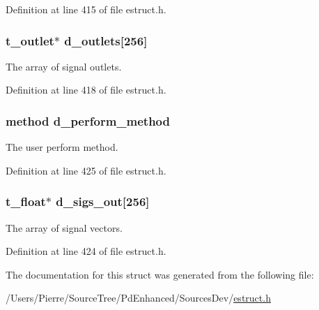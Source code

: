 Definition at line 415 of file estruct.\-h.

\hypertarget{struct__edspobj_a529a1e3597eb3ee79f6cabef51f41ef9}{
\subsubsection[{d\-\_\-outlets}]{\setlength{\rightskip}{0pt plus 5cm}t\-\_\-outlet$\ast$ d\-\_\-outlets\mbox{[}256\mbox{]}}}\label{struct__edspobj_a529a1e3597eb3ee79f6cabef51f41ef9}
The array of signal outlets. 

Definition at line 418 of file estruct.\-h.

\hypertarget{struct__edspobj_ae13acca7c0f073f1030545ce368e6e03}{
\subsubsection[{d\-\_\-perform\-\_\-method}]{\setlength{\rightskip}{0pt plus 5cm}method d\-\_\-perform\-\_\-method}}\label{struct__edspobj_ae13acca7c0f073f1030545ce368e6e03}
The user perform method. 

Definition at line 425 of file estruct.\-h.

\hypertarget{struct__edspobj_aebb3e36050cca90ec2bbfc8226198ca8}{
\subsubsection[{d\-\_\-sigs\-\_\-out}]{\setlength{\rightskip}{0pt plus 5cm}t\-\_\-float$\ast$ d\-\_\-sigs\-\_\-out\mbox{[}256\mbox{]}}}\label{struct__edspobj_aebb3e36050cca90ec2bbfc8226198ca8}
The array of signal vectors. 

Definition at line 424 of file estruct.\-h.



The documentation for this struct was generated from the following file\-:\begin{DoxyCompactItemize}
\item 
/\-Users/\-Pierre/\-Source\-Tree/\-Pd\-Enhanced/\-Sources\-Dev/\hyperlink{estruct_8h}{estruct.\-h}\end{DoxyCompactItemize}
